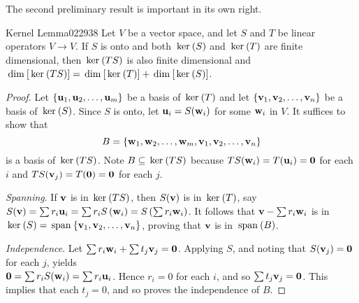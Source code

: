 The second preliminary result is important in its own right.


\begin{lemma}{Kernel Lemma}{022938}
Let $V$ be a vector space, and let $S$ and $T$ be linear operators $V \to V$. If $S$ is onto and both $\thinspace\operatorname{ker\medspace}(S)$ and $\thinspace\operatorname{ker\medspace}(T)$ are finite dimensional, then $\thinspace\operatorname{ker\medspace}(TS)$ is also finite dimensional and $\thinspace\operatorname{dim\medspace}[\thinspace\operatorname{ker\medspace}(TS)] = \thinspace\operatorname{dim\medspace}[\thinspace\operatorname{ker\medspace}(T)] + \thinspace\operatorname{dim\medspace}[\thinspace\operatorname{ker\medspace}(S)]$.
\end{lemma}

\begin{proof}
Let $\{\textbf{u}_{1}, \textbf{u}_{2}, \dots, \textbf{u}_{m}\}$ be a basis of $\thinspace\operatorname{ker\medspace}(T)$ and let $\{\textbf{v}_{1}, \textbf{v}_{2}, \dots, \textbf{v}_{n}\}$ be a basis of $\thinspace\operatorname{ker\medspace}(S)$. Since $S$ is onto, let $\textbf{u}_{i} = S(\textbf{w}_{i})$ for some $\textbf{w}_{i}$ in $V$. It suffices to show that
\begin{equation*}
B = \{\textbf{w}_1, \textbf{w}_2, \dots, \textbf{w}_m, \textbf{v}_1, \textbf{v}_2, \dots, \textbf{v}_n\}
\end{equation*}
is a basis of $\thinspace\operatorname{ker\medspace}(TS)$. Note $B \subseteq \thinspace\operatorname{ker\medspace}(TS)$ because $TS(\textbf{w}_{i}) = T(\textbf{u}_{i}) = \textbf{0}$ for each $i$ and $TS(\textbf{v}_{j}) = T(\textbf{0}) = \textbf{0}$ for each $j$.


\noindent \textit{Spanning}. If $\textbf{v}$ is in $\thinspace\operatorname{ker\medspace}(TS)$, then $S(\textbf{v})$ is in $\thinspace\operatorname{ker\medspace}(T)$, say $S(\textbf{v}) = \sum r_i\textbf{u}_i = \sum r_iS\left(\textbf{w}_i\right) = S\left(\sum r_i \textbf{w}_i\right)$. It follows that $\textbf{v} - \sum r_i\textbf{w}_i$ is in $\thinspace\operatorname{ker\medspace}(S) = \thinspace\operatorname{span\medspace}\{\textbf{v}_{1}, \textbf{v}_{2}, \dots, \textbf{v}_{n}\}$, proving that $\textbf{v}$ is in $\thinspace\operatorname{span\medspace}(B)$.


\noindent \textit{Independence}. Let $\sum r_i\textbf{w}_i + \sum t_j\textbf{v}_j = \textbf{0}$. Applying $S$, and noting that $S(\textbf{v}_{j}) = \textbf{0}$ for each $j$, yields \\ $\textbf{0} = \sum r_iS(\textbf{w}_i) = \sum r_i\textbf{u}_i$. Hence $r_{i} = 0$ for each $i$, and so $\sum t_j\textbf{v}_j = \textbf{0}$. This implies that each $t_{j} = 0$, and so proves the independence of $B$.
\end{proof}

